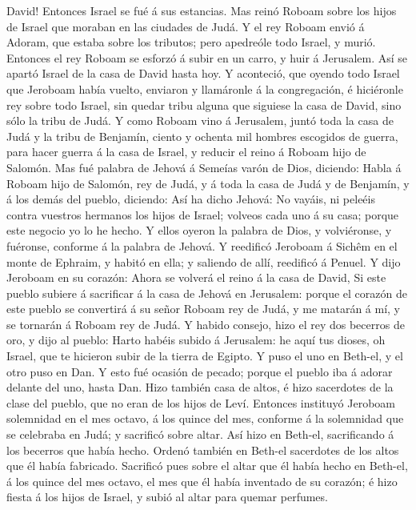 David! Entonces Israel se fué á sus estancias.  Mas reinó
Roboam sobre los hijos de Israel que moraban en las ciudades de Judá.
 Y el rey Roboam envió á Adoram, que estaba sobre los
tributos; pero apedreóle todo Israel, y murió. Entonces el rey Roboam se
esforzó á subir en un carro, y huir á Jerusalem.  Así se
apartó Israel de la casa de David hasta hoy.  Y aconteció,
que oyendo todo Israel que Jeroboam había vuelto, enviaron y llamáronle
á la congregación, é hiciéronle rey sobre todo Israel, sin quedar tribu
alguna que siguiese la casa de David, sino sólo la tribu de Judá.
 Y como Roboam vino á Jerusalem, juntó toda la casa de Judá
y la tribu de Benjamín, ciento y ochenta mil hombres escogidos de
guerra, para hacer guerra á la casa de Israel, y reducir el reino á
Roboam hijo de Salomón.  Mas fué palabra de Jehová á
Semeías varón de Dios, diciendo:  Habla á Roboam hijo de
Salomón, rey de Judá, y á toda la casa de Judá y de Benjamín, y á los
demás del pueblo, diciendo:  Así ha dicho Jehová: No
vayáis, ni peleéis contra vuestros hermanos los hijos de Israel; volveos
cada uno á su casa; porque este negocio yo lo he hecho. Y ellos oyeron
la palabra de Dios, y volviéronse, y fuéronse, conforme á la palabra de
Jehová.  Y reedificó Jeroboam á Sichêm en el monte de
Ephraim, y habitó en ella; y saliendo de allí, reedificó á Penuel.
 Y dijo Jeroboam en su corazón: Ahora se volverá el reino á
la casa de David,  Si este pueblo subiere á sacrificar á la
casa de Jehová en Jerusalem: porque el corazón de este pueblo se
convertirá á su señor Roboam rey de Judá, y me matarán á mí, y se
tornarán á Roboam rey de Judá.  Y habido consejo, hizo el
rey dos becerros de oro, y dijo al pueblo: Harto habéis subido á
Jerusalem: he aquí tus dioses, oh Israel, que te hicieron subir de la
tierra de Egipto.  Y puso el uno en Beth-el, y el otro puso
en Dan.  Y esto fué ocasión de pecado; porque el pueblo iba
á adorar delante del uno, hasta Dan.  Hizo también casa de
altos, é hizo sacerdotes de la clase del pueblo, que no eran de los
hijos de Leví.  Entonces instituyó Jeroboam solemnidad en
el mes octavo, á los quince del mes, conforme á la solemnidad que se
celebraba en Judá; y sacrificó sobre altar. Así hizo en Beth-el,
sacrificando á los becerros que había hecho. Ordenó también en Beth-el
sacerdotes de los altos que él había fabricado.  Sacrificó
pues sobre el altar que él había hecho en Beth-el, á los quince del mes
octavo, el mes que él había inventado de su corazón; é hizo fiesta á los
hijos de Israel, y subió al altar para quemar perfumes.

